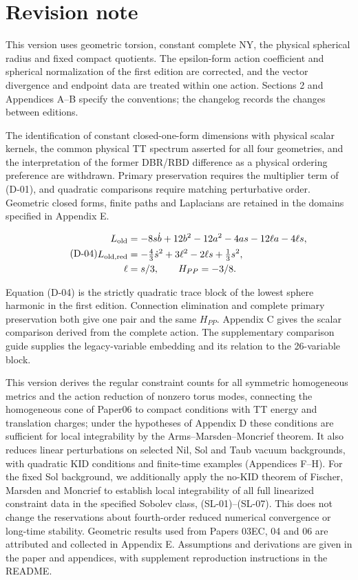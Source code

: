 \section{Revision note}

This version uses geometric torsion, constant complete NY, the physical spherical radius and fixed compact quotients. The epsilon-form action coefficient and spherical normalization of the first edition are corrected, and the vector divergence and endpoint data are treated within one action. Sections 2 and Appendices A--B specify the conventions; the changelog records the changes between editions.

The identification of constant closed-one-form dimensions with physical scalar kernels, the common physical TT spectrum asserted for all four geometries, and the interpretation of the former DBR/RBD difference as a physical ordering preference are withdrawn. Primary preservation requires the multiplier term of (D-01), and quadratic comparisons require matching perturbative order. Geometric closed forms, finite paths and Laplacians are retained in the domains specified in Appendix E.

\begin{equation}\tag{D-04}\label{eq:D-04}
\begin{aligned}L_{\rm old}&=-8s\dot b+12b^2-12a^2-4as-12\ell a-4\ell s,\\ L_{\rm old,red}&=-\tfrac43\dot s^2+3\ell^2-2\ell s+\tfrac13s^2,\\ \ell&=s/3,\qquad H_{PP}=-3/8.\end{aligned}
\end{equation}

Equation (D-04) is the strictly quadratic trace block of the lowest sphere harmonic in the first edition. Connection elimination and complete primary preservation both give one pair and the same $H_{PP}$. Appendix C gives the scalar comparison derived from the complete action. The supplementary comparison guide supplies the legacy-variable embedding and its relation to the 26-variable block.

This version derives the regular constraint counts for all symmetric homogeneous metrics and the action reduction of nonzero torus modes, connecting the homogeneous cone of Paper06 to compact conditions with TT energy and translation charges; under the hypotheses of Appendix D these conditions are sufficient for local integrability by the Arms--Marsden--Moncrief theorem. It also reduces linear perturbations on selected Nil, Sol and Taub vacuum backgrounds, with quadratic KID conditions and finite-time examples (Appendices F--H). For the fixed Sol background, we additionally apply the no-KID theorem of Fischer, Marsden and Moncrief to establish local integrability of all full linearized constraint data in the specified Sobolev class, (SL-01)--(SL-07). This does not change the reservations about fourth-order reduced numerical convergence or long-time stability. Geometric results used from Papers 03EC, 04 and 06 are attributed and collected in Appendix E. Assumptions and derivations are given in the paper and appendices, with supplement reproduction instructions in the README.
